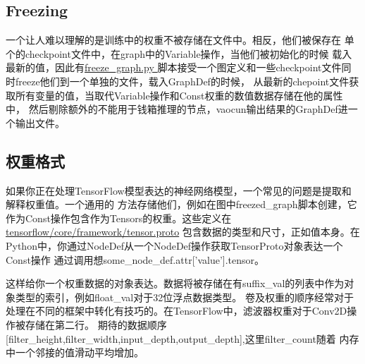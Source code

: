 \subsection{Freezing}
一个让人难以理解的是训练中的权重不被存储在文件中。相反，他们被保存在
单个的checkpoint文件中，在graph中的Variable操作，当他们被初始化的时候
载入最新的值，因此有\href{https://github.com/tensorflow/tensorflow/blob/master/tensorflow/python/tools/freeze_graph.py}{freeze_graph.py }
脚本接受一个图定义和一些checkpoint文件同时freeze他们到一个单独的文件，载入GraphDef的时候，
从最新的chepoint文件获取所有变量的值，当取代Variable操作和Const权重的数值数据存储在他的属性中，
然后剔除额外的不能用于钱箱推理的节点，vaocun输出结果的GraphDef进一个输出文件。
\subsection{权重格式}
如果你正在处理TensorFlow模型表达的神经网络模型，一个常见的问题是提取和解释权重值。一个通用的
方法存储他们，例如在图中freezed\_graph脚本创建，它作为Const操作包含作为Tensors的权重。这些定义在
\href{https://github.com/tensorflow/tensorflow/blob/master/tensorflow/core/framework/tensor.proto}{tensorflow/core/framework/tensor.proto}
包含数据的类型和尺寸，正如值本身。在Python中，你通过NodeDef从一个NodeDef操作获取TensorProto对象表达一个Const操作
通过调用想some\_node\_def.attr['value'].tensor。

这样给你一个权重数据的对象表达。数据将被存储在有suffix\_val的列表中作为对象类型的索引，例如float\_val对于32位浮点数据类型。
卷及权重的顺序经常对于处理在不同的框架中转化有技巧的。在TensorFlow中，滤波器权重对于Conv2D操作被存储在第二行。
期待的数据顺序[filter\_height,filter\_width,input\_depth,output\_depth],这里filter\_count随着
内存中一个邻接的值滑动平均增加。
